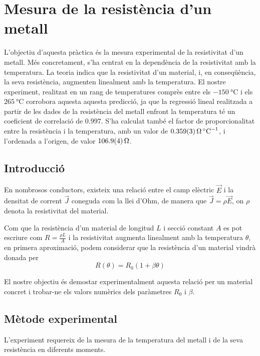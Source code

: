 \chapter{Mesura de la resistència d'un metall} \label{ch:informe 5} 
\begin{resum}
	L'objectiu d'aquesta pràctica és la mesura experimental de la resistivitat d'un metall. Més concretament, s'ha centrat en la dependència de la resistivitat amb la temperatura. La teoria indica que la resistivitat d'un material, i, en conseqüència, la seva resistència, augmenten linealment amb la temperatura. El nostre experiment, realitzat en un rang de temperatures comprès entre els $\SI{-150}{\celsius}$ i els $\SI{265}{\celsius}$ corrobora aquesta aquesta predicció, ja que la regressió lineal realitzada a partir de les dades de la resistència del metall enfront la temperatura té un coeficient de correlació de $0.997$. S'ha calculat també el factor de proporcionalitat entre la resistència i la temperatura, amb un valor de $\data{0.359}{0.003}{\ohm.\celsius^{-1}}$, i l'ordenada a l'origen, de valor $\data{106.9}{0.4}{\ohm}$.
\end{resum}

\section{Introducció}
En nombrosos conductors, existeix una relació entre el camp elèctric $\vec{E}$ i la densitat de corrent $\vec{J}$ coneguda com la llei d'Ohm, de manera que $\vec{J}=\rho\vec{E}$, on $\rho$ denota la resistivitat del material.

Com que la resistència d'un material de longitud $L$ i secció constant $A$ es pot escriure com $R=\frac{\rho L}{A}$ i la resistivitat augmenta linealment amb la temperatura \( \theta \), en primera aproximació, podem considerar que la resistència d'un material vindrà donada per 
\begin{equation} \label{eq:regressio}
R(\theta)=R_0(1+\beta\theta)
\end{equation}

El nostre objectiu és demostar experimentalment aquesta relació per un material concret i trobar-ne els valors numèrics dels paràmetres $R_0$ i $\beta$.

\section{Mètode experimental}
L'experiment requereix de la mesura de la temperatura del metall i de la seva resistència en diferents moments.

